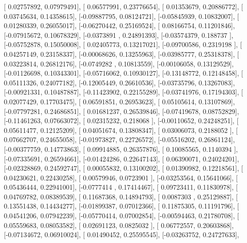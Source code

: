 \documentclass{article}
\begin{document}
       [ 0.02757892,  0.07979491],
       [ 0.06577991,  0.23776654],
       [ 0.01353679,  0.20886772],
       [ 0.03745634,  0.14358615],
       [-0.09887795,  0.08124721],
       [-0.05845939,  0.10832007],
       [ 0.01280339,  0.26055017],
       [-0.06270442,  0.25169524],
       [ 0.08166754,  0.11201846],
       [-0.07915672,  0.10678329],
       [-0.0373891 ,  0.24891393],
       [-0.03574379,  0.188737  ],
       [-0.05752878,  0.15050008],
       [ 0.02405773,  0.13217021],
       [-0.09700586,  0.2319198 ],
       [ 0.04257149,  0.23158337],
       [-0.00068626,  0.13255963],
       [-0.03985777,  0.25318378],
       [ 0.03223814,  0.26812176],
       [-0.0749282 ,  0.10813559],
       [-0.00106058,  0.13129529],
       [-0.01126698,  0.10343301],
       [-0.05716062,  0.10930127],
       [-0.13148772,  0.12148458],
       [ 0.05111326,  0.24077182],
       [-0.12005449,  0.26610536],
       [-0.03735796,  0.13267083],
       [-0.00921331,  0.10487887],
       [-0.11423902,  0.22155289],
       [-0.03741976,  0.17194303],
       [ 0.02077429,  0.17703475],
       [ 0.06591851,  0.26953623],
       [ 0.05105614,  0.13107869],
       [-0.07797281,  0.24686851],
       [ 0.01681237,  0.26539846],
       [-0.07419678,  0.08752829],
       [-0.11461263,  0.07663072],
       [ 0.02315232,  0.218068  ],
       [-0.00110652,  0.24248251],
       [ 0.05611477,  0.12125209],
       [ 0.04051674,  0.13808347],
       [ 0.03006073,  0.2188052 ],
       [ 0.07662707,  0.24655058],
       [-0.01973827,  0.22726572],
       [-0.05516202,  0.26861124],
       [-0.00377759,  0.14773863],
       [ 0.09914885,  0.26357876],
       [ 0.10085565,  0.1140394 ],
       [-0.07335691,  0.26594661],
       [-0.01424286,  0.22647143],
       [ 0.06390071,  0.24024201],
       [-0.02328869,  0.24592747],
       [ 0.00055832,  0.13100202],
       [ 0.01390982,  0.12218561],
       [ 0.04230621,  0.22430258],
       [ 0.00579946,  0.0723901 ],
       [-0.03253564,  0.15641066],
       [ 0.05436444,  0.22941001],
       [-0.0777414 ,  0.17414467],
       [ 0.09723411,  0.11830978],
       [ 0.04769782,  0.08389539],
       [ 0.11687368,  0.14894793],
       [ 0.0087303 ,  0.25129887],
       [ 0.13551438,  0.14434277],
       [-0.01899387,  0.07012366],
       [ 0.11875305,  0.11191796],
       [ 0.04541206,  0.07942239],
       [-0.05770414,  0.07002854],
       [-0.00594463,  0.21780708],
       [ 0.05559683,  0.08053582],
       [ 0.02691123,  0.0825032 ],
       [ 0.06772557,  0.20603868],
       [-0.07134672,  0.06910024],
       [ 0.01490452,  0.25595545],
       [-0.03263752,  0.24727633],
\end{document}
